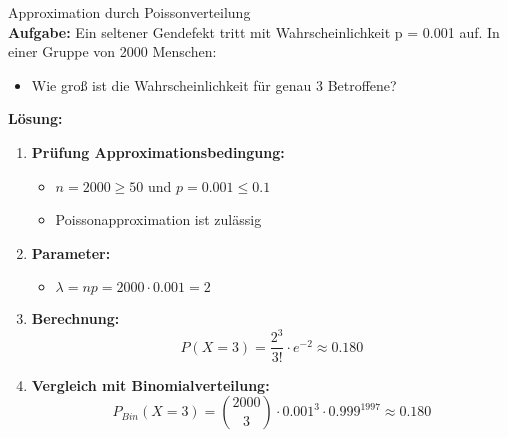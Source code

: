 \begin{example2}{Approximation durch Poissonverteilung}\\
\textbf{Aufgabe:} Ein seltener Gendefekt tritt mit Wahrscheinlichkeit p = 0.001 auf. In einer Gruppe von 2000 Menschen:
\begin{itemize}
\item Wie groß ist die Wahrscheinlichkeit für genau 3 Betroffene?
\end{itemize}

\textbf{Lösung:}
\begin{enumerate}
\item \textbf{Prüfung Approximationsbedingung:}
   \begin{itemize}
   \item $n = 2000 \geq 50$ und $p = 0.001 \leq 0.1$
   \item Poissonapproximation ist zulässig
   \end{itemize}

\item \textbf{Parameter:}
   \begin{itemize}
   \item $\lambda = np = 2000 \cdot 0.001 = 2$
   \end{itemize}

\item \textbf{Berechnung:}
   $$P(X = 3) = \frac{2^3}{3!} \cdot e^{-2} \approx 0.180$$

\item \textbf{Vergleich mit Binomialverteilung:}
   $$P_{Bin}(X = 3) = \binom{2000}{3} \cdot 0.001^3 \cdot 0.999^{1997} \approx 0.180$$
\end{enumerate}
\end{example2}

